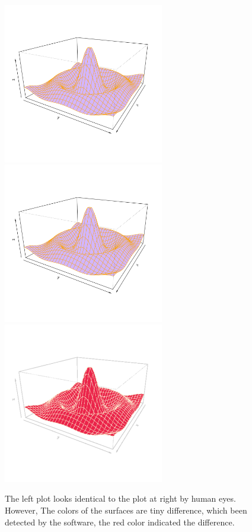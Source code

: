 \documentclass[11pt,twoside]{report}
\begin{document}
\begin{figure}[h!]
	\begin{center}
		\includegraphics[height = 7cm, width = 7cm]{figure/Chapter5_example_01.pdf}
		\includegraphics[height = 7cm, width = 7cm]{figure/Chapter5_example_02.pdf}
		\includegraphics[height = 7cm, width = 7cm]{figure/Chapter5_example_03.pdf}
		\caption{The left plot looks identical to the plot at right by human eyes. However, The colors of the surfaces are tiny difference, which been detected by the software, the red color indicated the difference.}
		\label{chapter5.1}
	\end{center}
\end{figure}
\end{document}
